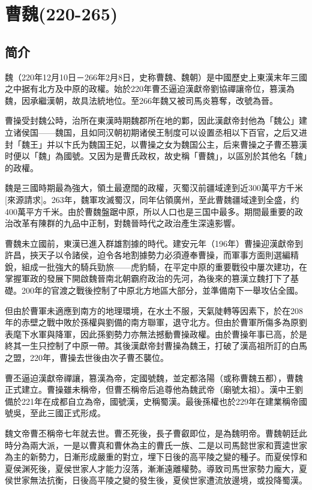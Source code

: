 

\section{曹魏\tiny(220-265)}

\subsection{简介}

魏（220年12月10日－266年2月8日，史称曹魏、魏朝）是中國歷史上東漢末年三國之中据有北方及中原的政權。始於220年曹丕逼迫漢獻帝劉協禪讓帝位，篡漢為魏，因承繼漢朝，故具法統地位。至266年魏又被司馬炎篡奪，改號為晉。

曹操受封魏公時，治所在東漢時期魏郡所在地的鄴，因此漢獻帝封他為「魏公」建立诸侯国——魏国，且如同汉朝初期诸侯王制度可以设置丞相以下百官，之后又进封「魏王」并以卞氏为魏国王妃，以曹操之女为魏国公主，后来曹操之子曹丕篡漢时便以「魏」為國號。又因为是曹氏政权，故史稱「曹魏」，以區別於其他名「魏」的政權。

魏是三國時期最為強大，領土最遼闊的政權，灭蜀汉前疆域達到近300萬平方千米[來源請求]。263年，魏軍攻滅蜀汉，同年佔領廣州，至此曹魏疆域達到全盛，约400萬平方千米。由於曹魏盤踞中原，所以人口也是三国中最多。期間最重要的政治改革有陳群的九品中正制，對魏晉時代之政治產生深遠影響。

曹魏未立國前，東漢已進入群雄割據的時代。建安元年（196年）曹操迎漢獻帝到許昌，挾天子以令諸侯，迫令各地割據勢力必須遵奉曹操，而軍事方面則選編精銳，組成一批強大的騎兵勁旅——虎豹騎，在平定中原的重要戰役中屢次建功，在掌握軍政的發展下開啟魏晉南北朝霸府政治的先河，為後來的篡漢立魏打下了基礎。200年的官渡之戰後控制了中原北方地區大部分，並準備南下一舉攻佔全國。

但由於曹軍未適應到南方的地理環境，在水土不服，天氣陡轉等因素下，於在208年的赤壁之戰中敗於孫權與劉備的南方聯軍，退守北方。但由於曹軍所傷多為原劉表麾下水軍與降軍，因此孫劉勢力亦無法撼動曹操政權。由於曹操年事已高，於是終其一生只控制了中原一帶。其後漢獻帝封曹操為魏王，打破了漢高祖所訂的白馬之盟，220年，曹操去世後由次子曹丕襲位。

曹丕逼迫漢獻帝禪讓，篡漢為帝，定國號魏，並定都洛陽（或称曹魏五都），曹魏正式建立。曹操雖未稱帝，但曹丕稱帝后追尊他為魏武帝（廟號太祖）。漢中王劉備於221年在成都自立為帝，國號漢，史稱蜀漢。最後孫權也於229年在建業稱帝國號吳，至此三國正式形成。

魏文帝曹丕稱帝七年就去世。曹丕死後，長子曹叡即位，是為魏明帝。曹魏朝廷此時分為兩大派，一是以曹真和曹休為主的曹氏一族、二是以司馬懿世家和賈逵世家為主的新勢力，日漸形成嚴重的對立，埋下日後的高平陵之變的種子。而夏侯惇和夏侯渊死後，夏侯世家人才能力沒落，漸漸遠離權勢。導致司馬世家勢力龐大，夏侯世家無法抗衡，日後高平陵之變的發生後，夏侯世家遭流放邊境，或投降蜀漢。


